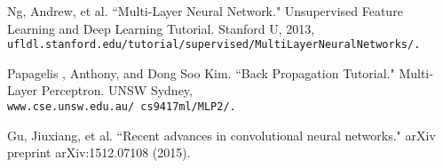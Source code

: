 \documentclass[12pt]{report}
\begin{document}
\begin{thebibliography}{}
Ng, Andrew, et al. ``Multi-Layer Neural Network." Unsupervised Feature Learning and Deep Learning Tutorial. Stanford U, 2013, \\\texttt{ufldl.stanford.edu/tutorial/supervised/MultiLayerNeuralNetworks/.}

Papagelis , Anthony, and Dong Soo Kim. ``Back Propagation Tutorial." Multi-Layer Perceptron. UNSW Sydney, \\\texttt{www.cse.unsw.edu.au/~cs9417ml/MLP2/.}


Gu, Jiuxiang, et al. ``Recent advances in convolutional neural networks." arXiv preprint arXiv:1512.07108 (2015).


\end{thebibliography}
\endgroup
\end{document}
